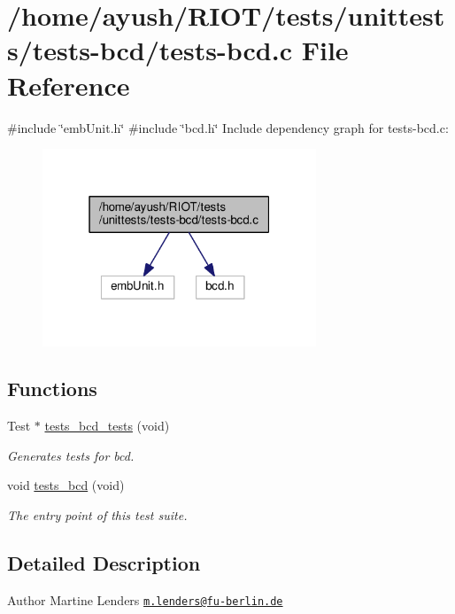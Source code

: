 \hypertarget{tests-bcd_8c}{}\section{/home/ayush/\+R\+I\+O\+T/tests/unittests/tests-\/bcd/tests-\/bcd.c File Reference}
\label{tests-bcd_8c}
{\ttfamily \#include \char`\"{}emb\+Unit.\+h\char`\"{}}\newline
{\ttfamily \#include \char`\"{}bcd.\+h\char`\"{}}\newline
Include dependency graph for tests-\/bcd.c\+:
\nopagebreak
\begin{figure}[H]
\begin{center}
\leavevmode
\includegraphics[width=232pt]{tests-bcd_8c__incl}
\end{center}
\end{figure}
\subsection*{Functions}
\textbf{ }\par
\begin{DoxyCompactItemize}
\item 
Test $\ast$ \hyperlink{group__unittests_ga67d8fcec140a78689e78a00ba4b2582e}{tests\+\_\+bcd\+\_\+tests} (void)
\begin{DoxyCompactList}\small\item\em Generates tests for bcd. \end{DoxyCompactList}\item 
void \hyperlink{group__unittests_ga743f1615d5742924d9f921a17fe159a6}{tests\+\_\+bcd} (void)
\begin{DoxyCompactList}\small\item\em The entry point of this test suite. \end{DoxyCompactList}\end{DoxyCompactItemize}



\subsection{Detailed Description}
\begin{DoxyAuthor}{Author}
Martine Lenders \href{mailto:m.lenders@fu-berlin.de}{\tt m.\+lenders@fu-\/berlin.\+de} 
\end{DoxyAuthor}
